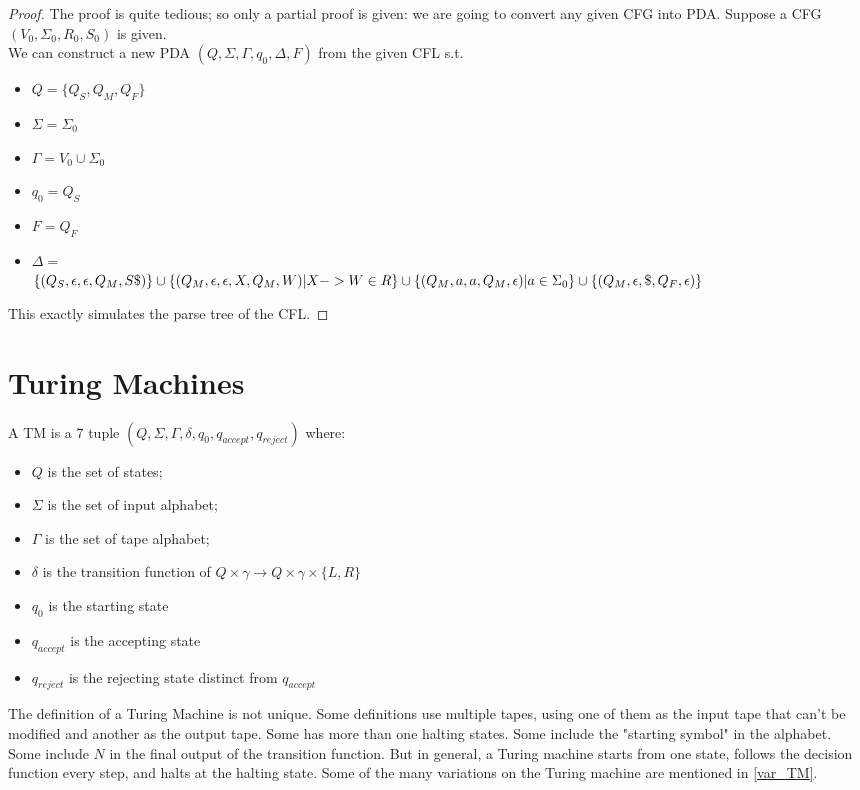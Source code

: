 \documentclass{report}
\begin{document}
			\begin{proof}
				The proof is quite tedious; so only a partial proof is given: we are going to convert any given CFG into PDA.
				Suppose a CFG $(V_0,\Sigma_0,R_0,S_0)$ is given.\\
				We can construct a new PDA $(Q,\Sigma,\Gamma,q_0,\Delta,F)$ from the given CFL s.t.
				\begin{itemize}
					\item $Q=\{Q_S,Q_M,Q_F\}$
					\item $\Sigma=\Sigma_0$
					\item $\Gamma=V_0 \cup \Sigma_0$
					\item $q_0=Q_S$
					\item $F=Q_F$
					\item $\Delta=$\\
					\begin{math}
					\{(Q_S,\epsilon,\epsilon,Q_M,S\$)\}\cup\\
					\{(Q_M,\epsilon,\epsilon,X,Q_M,W)|X->W \in R\}\cup\\
					\{(Q_M,a,a,Q_M,\epsilon)|a \in \Sigma_0\}\cup\\
					\{(Q_M,\epsilon,\$,Q_F,\epsilon)\}
					\end{math}
				\end{itemize}
				This exactly simulates the parse tree of the CFL.
			\end{proof}
	
	\section{Turing Machines}
		\begin{defn} \label{def_TM} %
			A TM is a 7 tuple $(Q,\Sigma,\Gamma,\delta,q_0,q_{accept},q_{reject})$ where:
			\begin{itemize}
				\item $Q$ is the set of states;
				\item $\Sigma$ is the set of input alphabet;
				\item $\Gamma$ is the set of tape alphabet;
				\item $\delta$ is the transition function of $Q \times \gamma \rightarrow Q \times \gamma \times \{L,R\}$
				\item $q_0$ is the starting state
				\item $q_{accept}$ is the accepting state
				\item $q_{reject}$ is the rejecting state distinct from $q_{accept}$
			\end{itemize}
		\end{defn}
		The definition of a Turing Machine is not unique. Some definitions use multiple tapes, using one of them as the input tape that can't be modified and another as the output tape. Some has more than one halting states. Some include the "starting symbol" in the alphabet. Some include $N$ in the final output of the transition function. But in general, a Turing machine starts from one state, follows the decision function every step, and halts at the halting state. Some of the many variations on the Turing machine are mentioned in \ref{var_TM}.
		
\end{document}
